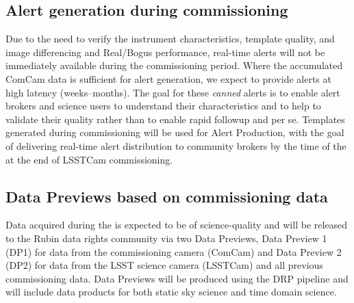 \subsection{Alert generation during commissioning}

Due to the need to verify the instrument characteristics, template quality, and image differencing and Real/Bogus performance, real-time alerts will not be immediately available during the commissioning period.
Where the accumulated ComCam data is sufficient for alert generation, we expect to provide alerts at high latency (weeks--months).
The goal for these {\it canned} alerts is to enable alert brokers and science users to understand their characteristics and to help to validate their quality rather than to enable rapid followup and \es per se.
Templates generated during commissioning will be used for Alert Production, with the goal of delivering real-time alert distribution to community brokers by the time of the \svs at the end of LSSTCam commissioning.

\subsection{Data Previews based on commissioning data}

Data acquired during the \svs is expected to be of science-quality and will be released to the Rubin data rights community via two Data Previews, Data Preview 1 (DP1) for data from the commissioning camera (ComCam) and Data Preview 2 (DP2) for data from the LSST science camera (LSSTCam) and all previous commissioning data.
Data Previews will be produced using the DRP pipeline and will include data products for both static sky science and time domain science.

